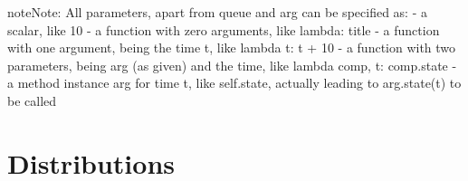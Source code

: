 \documentclass[letterpaper,10pt,english]{sphinxmanual}
\begin{document}
\begin{fulllineitems}
\begin{sphinxadmonition}{note}{Note:}
All parameters, apart from queue and arg can be specified as: 
- a scalar, like 10 
- a function with zero arguments, like lambda: title 
- a function with one argument, being the time t, like lambda t: t + 10 
- a function with two parameters, being arg (as given) and the time, like lambda comp, t: comp.state 
- a method instance arg for time t, like self.state, actually leading to arg.state(t) to be called
\end{sphinxadmonition}

\end{fulllineitems}



\section{Distributions}
\label{\detokenize{Reference:distributions}}
\end{document}
